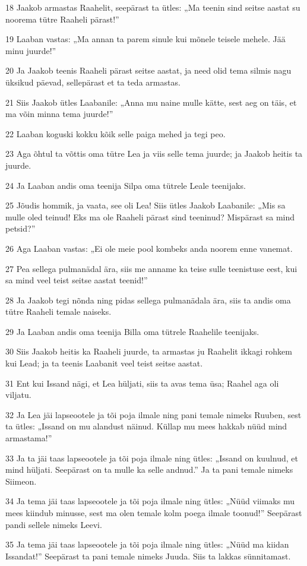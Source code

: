 \par 18 Jaakob armastas Raahelit, seepärast ta ütles: „Ma teenin sind seitse aastat su noorema tütre Raaheli pärast!”
\par 19 Laaban vastas: „Ma annan ta parem sinule kui mõnele teisele mehele. Jää minu juurde!”
\par 20 Ja Jaakob teenis Raaheli pärast seitse aastat, ja need olid tema silmis nagu üksikud päevad, sellepärast et ta teda armastas.
\par 21 Siis Jaakob ütles Laabanile: „Anna mu naine mulle kätte, sest aeg on täis, et ma võin minna tema juurde!”
\par 22 Laaban koguski kokku kõik selle paiga mehed ja tegi peo.
\par 23 Aga õhtul ta võttis oma tütre Lea ja viis selle tema juurde; ja Jaakob heitis ta juurde.
\par 24 Ja Laaban andis oma teenija Silpa oma tütrele Leale teenijaks.
\par 25 Jõudis hommik, ja vaata, see oli Lea! Siis ütles Jaakob Laabanile: „Mis sa mulle oled teinud! Eks ma ole Raaheli pärast sind teeninud? Mispärast sa mind petsid?”
\par 26 Aga Laaban vastas: „Ei ole meie pool kombeks anda noorem enne vanemat.
\par 27 Pea sellega pulmanädal ära, siis me anname ka teise sulle teenistuse eest, kui sa mind veel teist seitse aastat teenid!”
\par 28 Ja Jaakob tegi nõnda ning pidas sellega pulmanädala ära, siis ta andis oma tütre Raaheli temale naiseks.
\par 29 Ja Laaban andis oma teenija Billa oma tütrele Raahelile teenijaks.
\par 30 Siis Jaakob heitis ka Raaheli juurde, ta armastas ju Raahelit ikkagi rohkem kui Lead; ja ta teenis Laabanit veel teist seitse aastat.
\par 31 Ent kui Issand nägi, et Lea hüljati, siis ta avas tema üsa; Raahel aga oli viljatu.
\par 32 Ja Lea jäi lapseootele ja tõi poja ilmale ning pani temale nimeks Ruuben, sest ta ütles: „Issand on mu alandust näinud. Küllap mu mees hakkab nüüd mind armastama!”
\par 33 Ja ta jäi taas lapseootele ja tõi poja ilmale ning ütles: „Issand on kuulnud, et mind hüljati. Seepärast on ta mulle ka selle andnud.” Ja ta pani temale nimeks Siimeon.
\par 34 Ja tema jäi taas lapseootele ja tõi poja ilmale ning ütles: „Nüüd viimaks mu mees kiindub minusse, sest ma olen temale kolm poega ilmale toonud!” Seepärast pandi sellele nimeks Leevi.
\par 35 Ja tema jäi taas lapseootele ja tõi poja ilmale ning ütles: „Nüüd ma kiidan Issandat!” Seepärast ta pani temale nimeks Juuda. Siis ta lakkas sünnitamast.

